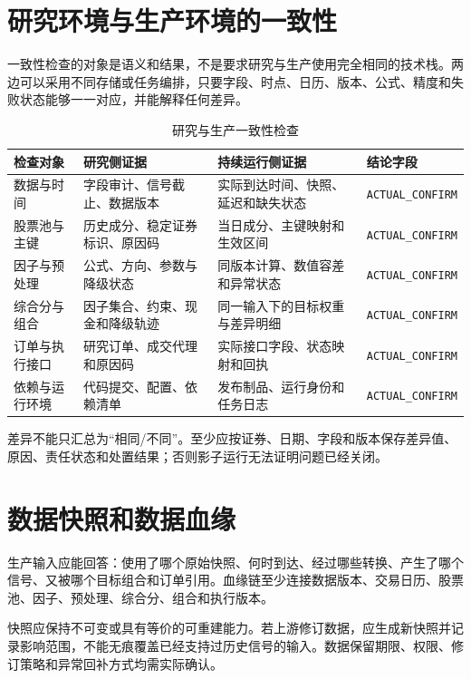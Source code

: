 \section{研究环境与生产环境的一致性}

一致性检查的对象是语义和结果，不是要求研究与生产使用完全相同的技术栈。两边可以采用不同存储或任务编排，只要字段、时点、日历、版本、公式、精度和失败状态能够一一对应，并能解释任何差异。

\begin{table}[htbp]
  \centering
  \footnotesize
  \setlength{\tabcolsep}{3pt}
  \caption{研究与生产一致性检查}
  \label{tab:appD-consistency}
  \begin{tabularx}{\textwidth}{p{3.0cm} p{4.4cm} p{4.4cm} Y}
    \toprule
    检查对象 & 研究侧证据 & 持续运行侧证据 & 结论字段 \\
    \midrule
    数据与时间 & 字段审计、信号截止、数据版本 & 实际到达时间、快照、延迟和缺失状态 & \texttt{ACTUAL\_CONFIRM} \\
    股票池与主键 & 历史成分、稳定证券标识、原因码 & 当日成分、主键映射和生效区间 & \texttt{ACTUAL\_CONFIRM} \\
    因子与预处理 & 公式、方向、参数与降级状态 & 同版本计算、数值容差和异常状态 & \texttt{ACTUAL\_CONFIRM} \\
    综合分与组合 & 因子集合、约束、现金和降级轨迹 & 同一输入下的目标权重与差异明细 & \texttt{ACTUAL\_CONFIRM} \\
    订单与执行接口 & 研究订单、成交代理和原因码 & 实际接口字段、状态映射和回执 & \texttt{ACTUAL\_CONFIRM} \\
    依赖与运行环境 & 代码提交、配置、依赖清单 & 发布制品、运行身份和任务日志 & \texttt{ACTUAL\_CONFIRM} \\
    \bottomrule
  \end{tabularx}
\end{table}

差异不能只汇总为“相同/不同”。至少应按证券、日期、字段和版本保存差异值、原因、责任状态和处置结果；否则影子运行无法证明问题已经关闭。

\section{数据快照和数据血缘}

生产输入应能回答：使用了哪个原始快照、何时到达、经过哪些转换、产生了哪个信号、又被哪个目标组合和订单引用。血缘链至少连接数据版本、交易日历、股票池、因子、预处理、综合分、组合和执行版本。

快照应保持不可变或具有等价的可重建能力。若上游修订数据，应生成新快照并记录影响范围，不能无痕覆盖已经支持过历史信号的输入。数据保留期限、权限、修订策略和异常回补方式均需实际确认。


